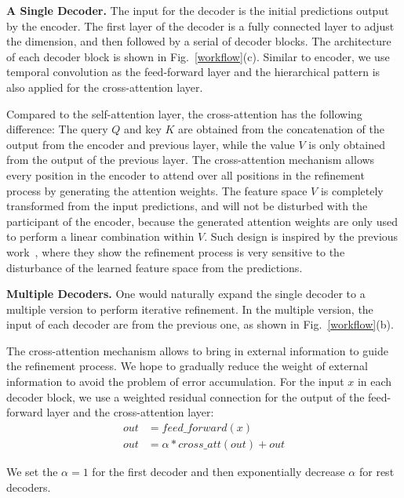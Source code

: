 \documentclass{bmvc2k}
\begin{document}
\noindent
\textbf{A Single Decoder.} 
The input for the decoder is the initial predictions output by the encoder. The first layer of the decoder is a fully connected layer to adjust the dimension, and then followed by a serial of decoder blocks. The architecture of each decoder block is shown in Fig.~\ref{workflow}(c). Similar to encoder, we use temporal convolution as the feed-forward layer and the hierarchical pattern is also applied for the cross-attention layer. 


Compared to the self-attention layer, the cross-attention has the following difference: The query $Q$ and key $K$ are obtained from the concatenation of the output from the encoder and previous layer, while the value $V$ is only obtained from the output of the previous layer. The cross-attention mechanism allows every position in the encoder to attend over all positions in the refinement process by generating the attention weights. The feature space $V$ is completely transformed from the input predictions, and will not be disturbed with the participant of the encoder, because the generated attention weights are only used to perform a linear combination within $V$. Such design is inspired by the previous work~\cite{MSTCN}, where they show the refinement process is very sensitive to the disturbance of the learned feature space from the predictions. 

\textbf{Multiple Decoders.} One would naturally expand the single decoder to a multiple version to perform iterative refinement. In the multiple version, the input of each decoder are from the previous one, as shown in Fig.~\ref{workflow}(b). 

The cross-attention mechanism allows to bring in external information to guide the refinement process. We hope to gradually reduce the weight of external information to avoid the problem of error accumulation. For the input $x$ in each decoder block, we use a weighted residual connection for the output of the feed-forward layer and the cross-attention layer:
\begin{equation}
\begin{aligned}
  {out} &= {feed\_forward}(x) \\
  {out} &= \alpha * {cross\_att}({out}) + {out}
\end{aligned}
\end{equation} 



We set the $\alpha=1$ for the first decoder and then exponentially decrease $\alpha$ for rest decoders.
\end{document}
